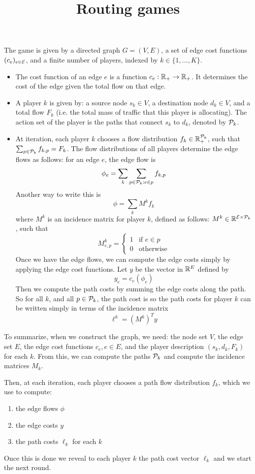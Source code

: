 \documentclass[10pt,a4paper]{article}
\title{Routing games}
\date{}
\begin{document}
\maketitle


The game is given by a directed graph $G = (V, E)$, a set of edge cost functions $(c_e)_{e \in \mathcal{E}}$, and a finite number of players, indexed by $k \in \{1, \dots, K\}$.

\begin{itemize}
\item The cost function of an edge $e$ is a function $c_e : \mathbb{R}_+ \to \mathbb{R}_+$. It determines the cost of the edge given the total flow on that edge.
\item A player $k$ is given by: a source node $s_k \in V$, a destination node $d_k \in V$, and a total flow $F_k$ (i.e. the total mass of traffic that this player is allocating). The action set of the player is the paths that connect $s_k$ to $d_k$, denoted by $\mathcal{P}_k$.
\item At iteration, each player $k$ chooses a flow distribution $f_k \in \mathbb{R}_+^{\mathcal{P}_k}$, such that $\sum_{p \in \mathcal{P}_k} f_{k,p} = F_k$. The flow distributions of all players determine the edge flows as follows: for an edge $e$, the edge flow is
\[
\phi_e = \sum_k \sum_{p \in \mathcal{P}_k : e \in p} f_{k, p}
\]
Another way to write this is
\[
\phi = \sum_{k} M^k f_k
\]
where $M^k$ is an incidence matrix for player $k$, defined as follows: $M^k \in \mathbb{R}^{\mathcal{E} \times \mathcal{P}_k}$, such that 
\[
M^k_{e, p} = \begin{cases}
1 & \text{if $e \in p$} \\
0 & \text{otherwise}
\end{cases}
\]
Once we have the edge flows, we can compute the edge costs simply by applying the edge cost functions. Let $y$ be the vector in $\mathbb{R}^{E}$ defined by
\[
y_e = c_e(\phi_e)
\]
Then we compute the path costs by summing the edge costs along the path. So for all $k$, and all $p \in \mathcal{P}_k$, the path cost is
so the path costs for player $k$ can be written simply in terms of the incidence matrix
\[
\ell^k = (M^k)^T y
\]
\end{itemize}

To summarize, when we construct the graph, we need: the node set $V$, the edge set $E$, the edge cost functions $c_e, e \in E$, and the player description $(s_k, d_k, F_k)$ for each $k$. From this, we can compute the paths $\mathcal{P}_k$ and compute the incidence matrices $M_k$. 

Then, at each iteration, each player chooses a path flow distribution $f_k$, which we use to compute:
\begin{enumerate}
\item the edge flows $\phi$
\item the edge costs $y$
\item the path costs $\ell_k$ for each $k$
\end{enumerate}

Once this is done we reveal to each player $k$ the path cost vector $\ell_k$ and we start the next round.
\end{document}
